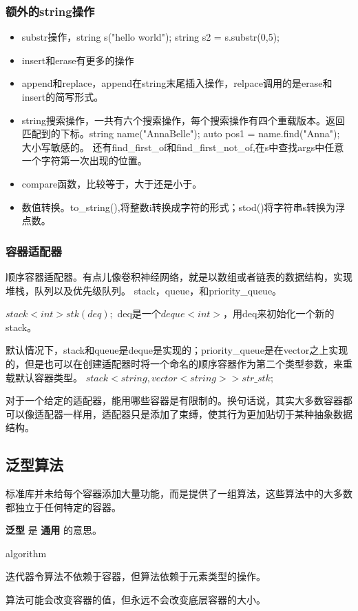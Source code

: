 \subsubsection{额外的string操作}
\begin{itemize}
	\item substr操作，string s("hello world"); string s2 = s.substr(0,5);
	\item insert和erase有更多的操作
	\item append和replace，append在string末尾插入操作，relpace调用的是erase和insert的简写形式。
	\item string搜索操作，一共有六个搜索操作，每个搜索操作有四个重载版本。返回匹配到的下标。string name("AnnaBelle"); auto pos1 = name.find("Anna"); 大小写敏感的。
	还有find\_first\_of和find\_first\_not\_of,在s中查找args中任意一个字符第一次出现的位置。
	\item compare函数，比较等于，大于还是小于。
	\item 数值转换。to\_string(),将整数i转换成字符的形式；stod()将字符串s转换为浮点数。
\end{itemize}

\subsubsection{容器适配器}
顺序容器适配器。有点儿像卷积神经网络，就是以数组或者链表的数据结构，实现堆栈，队列以及优先级队列。 stack，queue，和priority\_queue。

$stack<int> stk(deq);$ deq是一个$deque<int>$，用deq来初始化一个新的stack。

默认情况下，stack和queue是deque是实现的；priority\_queue是在vector之上实现的，但是也可以在创建适配器时将一个命名的顺序容器作为第二个类型参数，来重载默认容器类型。
$stack<string,vector<string>> str\_stk;$

对于一个给定的适配器，能用哪些容器是有限制的。换句话说，其实大多数容器都可以像适配器一样用，适配器只是添加了束缚，使其行为更加贴切于某种抽象数据结构。

\subsection{泛型算法}
标准库并未给每个容器添加大量功能，而是提供了一组算法，这些算法中的大多数都独立于任何特定的容器。

\textbf{泛型} 是 \textbf{通用} 的意思。

algorithm

迭代器令算法不依赖于容器，但算法依赖于元素类型的操作。

算法可能会改变容器的值，但永远不会改变底层容器的大小。





